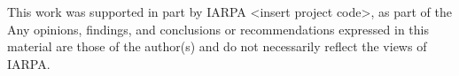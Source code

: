 \documentclass[12pt]{report}
\begin{document}
\vfill


This work was supported in part by IARPA <insert project code>, as part of the %
Any opinions, findings, and conclusions or recommendations expressed in this material are those of the author(s) and do not necessarily reflect the views of IARPA.

\pagebreak


\tableofcontents
\pagebreak

\listoffigures
\pagebreak

\listoftables
\pagebreak

\pagestyle{myheadings}

\doublespacing






%
%

%



%



\cleardoublepage
{}
{}


\end{document}
